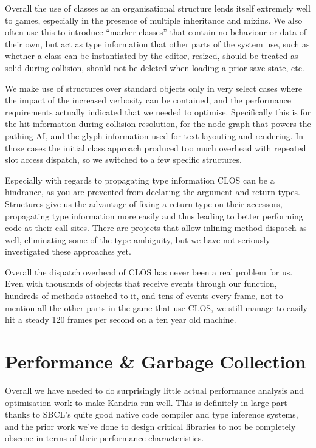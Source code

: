 \documentclass[format=sigconf]{acmart}
\begin{document}
Overall the use of classes as an organisational structure lends itself extremely well to games, especially in the presence of multiple inheritance and mixins. We also often use this to introduce ``marker classes'' that contain no behaviour or data of their own, but act as type information that other parts of the system use, such as whether a class can be instantiated by the editor, resized, should be treated as solid during collision, should not be deleted when loading a prior save state, etc.

We make use of structures over standard objects only in very select cases where the impact of the increased verbosity can be contained, and the performance requirements actually indicated that we needed to optimise. Specifically this is for the hit information during collision resolution, for the node graph that powers the pathing AI, and the glyph information used for text layouting and rendering. In those cases the initial class approach produced too much overhead with repeated slot access dispatch, so we switched to a few specific structures.

Especially with regards to propagating type information CLOS can be a hindrance, as you are prevented from declaring the argument and return types. Structures give us the advantage of fixing a return type on their accessors, propagating type information more easily and thus leading to better performing code at their call sites. There are projects that allow inlining method dispatch as well, eliminating some of the type ambiguity, but we have not seriously investigated these approaches yet.

Overall the dispatch overhead of CLOS has never been a real problem for us. Even with thousands of objects that receive events through our  function, hundreds of methods attached to it, and tens of events every frame, not to mention all the other parts in the game that use CLOS, we still manage to easily hit a steady 120 frames per second on a ten year old machine.

\section{Performance \& Garbage Collection}\label{performance}
Overall we have needed to do surprisingly little actual performance analysis and optimisation work to make Kandria run well. This is definitely in large part thanks to SBCL's quite good native code compiler and type inference systems, and the prior work we've done to design critical libraries to not be completely obscene in terms of their performance characteristics.
\end{document}
